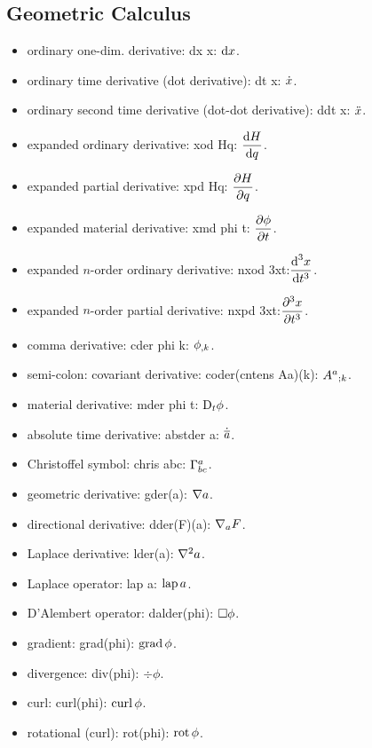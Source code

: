 \begin{multicols}{2}
\subsection{Geometric Calculus}
\begin{itemize}
\item ordinary one-dim. derivative: dx x: $\dx x$.
\item ordinary time derivative (dot derivative): dt x: $\dt x$.
\item ordinary second time derivative (dot-dot derivative): ddt x: $\ddt x$.
\item expanded ordinary derivative: xod Hq: $\xod Hq$.
\item expanded partial derivative: xpd Hq: $\xpd Hq$.
\item expanded material derivative: xmd phi t: $\xpd\phi t$.
\item expanded $n$-order ordinary derivative: nxod 3xt:$\nxod 3xt$.
\item expanded $n$-order partial derivative: nxpd 3xt:$\nxpd 3xt$.
\item comma derivative: cder phi k: $\cder\phi k$.
\item semi-colon: covariant derivative: coder(cntens Aa)(k): $\coder{\cntens Aa}{k}$.
\item material derivative: mder phi t: $\mder \phi t$.
\item absolute time derivative: abstder a: $\abstder a$.
\item Christoffel symbol: chris abc: $\chris abc$.
\item geometric derivative: gder(a): $\gder{a}$.
\item directional derivative: dder(F)(a): $\dder F{a}$.
\item Laplace derivative: lder(a): $\lder{a}$.
\item Laplace operator: lap a: $\lap a$.
\item D'Alembert operator: dalder(phi): $\dalder\phi$.
\item gradient: grad(phi): $\grad\phi$.
\item divergence: div(phi): $\div\phi$.
\item curl: curl(phi): $\curl\phi$.
\item rotational (curl): rot(phi): $\rot\phi$.
\end{itemize}



\end{multicols}
